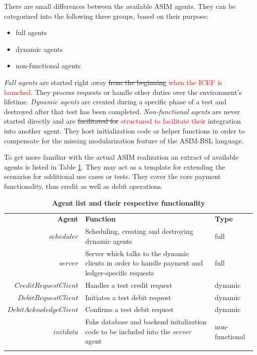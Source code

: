 There are small differences between the available ASIM agents. They can be categorized into the following three groups, based on their purpose:
\begin{itemize}
	\item full agents
	\item dynamic agents
	\item non-functional agents
\end{itemize}
\textit{Full agents} are started right away \st{from the beginning} \textcolor{red}{when the ICEF is launched}. They process requests or handle other duties over the environment's lifetime. \textit{Dynamic agents} are created during a specific phase of a test and destroyed after that test has been completed. \textit{Non-functional agents} are never started directly and are \st{facilitated for} \textcolor{red}{structured to facilitate their} integration into another agent. They host initialization code or helper functions in order to compensate for the missing modularization feature of the ASIM-BSL language.

To get more familiar with the actual ASIM realization an extract of available agents is listed in Table \ref{tab:model-agents}. They may act as a template for extending the scenarios for additional use cases or tests. They cover the core payment functionality, thus credit as well as debit operations.

\begin{table}[H]
\begin{centering}
\small
{
\begin{tabular}{ r | p{9cm} | l }
\hline
\textbf{Agent}	& \textbf{Function} & \textbf{Type} \\
\Xhline{1.5pt}
$scheduler$				& Scheduling, creating and destroying dynamic agents & full\\[3pt]
\hline
$server$				& Server which talks to the dynamic clients in order to handle payment and ledger-specific requests & full\\[3pt]
\hline
$CreditRequestClient$	& Handles a test credit request & dynamic\\[3pt]
\hline
$DebitRequestClient$	& Initiates a test debit request & dynamic\\[3pt]
\hline
$DebitAcknoledgeClient$	& Confirms a test debit request & dynamic\\[3pt]
\hline
$initdata$				& Fake database and backend initalization code to be included into the \textit{server} agent & non-functional\\[3pt]
\Xhline{1.5pt}
\end{tabular}
}
\caption{\small\textbf{Agent list and their respective functionality}}
\label{tab:model-agents}
\end{centering}
\vspace{-0.5cm}
\end{table}

